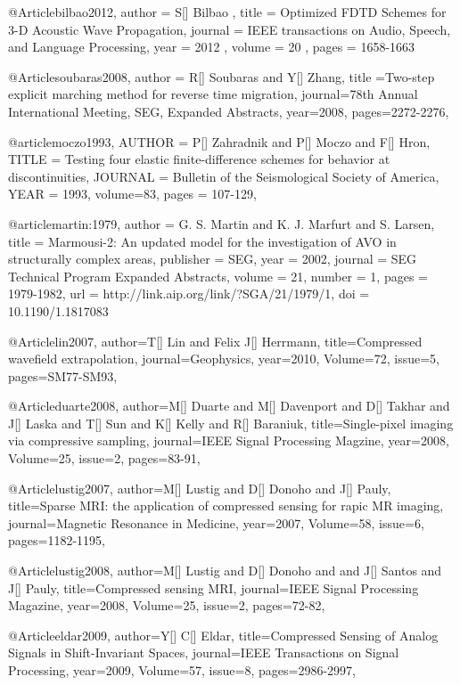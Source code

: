 {@Article{bilbao2012,
 author =  { S[] Bilbao },
 title =   {Optimized FDTD Schemes for 3-D Acoustic Wave Propagation},
 journal = { IEEE transactions on Audio, Speech, and Language Processing},
 year =    { 2012 },
 volume =  { 20 },
 pages =   { 1658-1663}
}

@Article{soubaras2008,
  author = {R[] Soubaras and Y[] Zhang},
  title ={Two-step explicit marching method for reverse time migration},
  journal={78th Annual International Meeting, SEG, Expanded Abstracts},
  year=2008,
  pages={2272-2276},
}

@article{moczo1993,
  AUTHOR =       {P[] Zahradnik and P[] Moczo and F[] Hron},
  TITLE =        {Testing four elastic finite-difference schemes for behavior at discontinuities},
  JOURNAL =      {Bulletin of the Seismological Society of America},
  YEAR =         {1993},
  volume=83,
  pages = {107-129},
}

@article{martin:1979,
  author =	 {G. S. Martin and K. J. Marfurt and S. Larsen},
  title =	 {Marmousi-2: An updated model for the investigation
                  of AVO in structurally complex areas},
  publisher =	 {SEG},
  year =	 2002,
  journal =	 {SEG Technical Program Expanded Abstracts},
  volume =	 21,
  number =	 1,
  pages =	 {1979-1982},
  url =		 {http://link.aip.org/link/?SGA/21/1979/1},
  doi =		 {10.1190/1.1817083}
}

@Article{lin2007,
  author={T[] Lin and Felix J[] Herrmann},
  title={Compressed wavefield extrapolation},
  journal={Geophysics},
  year=2010,
  Volume=72,
  issue=5,
  pages={SM77-SM93},
}

@Article{duarte2008,
  author={M[] Duarte and M[] Davenport and D[] Takhar and J[] Laska and T[] Sun and K[] Kelly and R[] Baraniuk},
  title={Single-pixel imaging via compressive sampling},
  journal={IEEE Signal Processing Magzine},
  year=2008,
  Volume=25,
  issue=2,
  pages={83-91},
}

@Article{lustig2007,
  author={M[] Lustig and D[] Donoho and J[] Pauly},
  title={Sparse MRI: the application of compressed sensing for rapic MR imaging},
  journal={Magnetic Resonance in Medicine},
  year=2007,
  Volume=58,
  issue=6,
  pages={1182-1195},
}

@Article{lustig2008,
  author={M[] Lustig and D[] Donoho and and J[] Santos and J[] Pauly},
  title={Compressed sensing MRI},
  journal={IEEE Signal Processing Magazine},
  year=2008,
  Volume=25,
  issue=2,
  pages={72-82},
}

@Article{eldar2009,
  author={Y[] C[] Eldar},
  title={Compressed Sensing of Analog Signals in Shift-Invariant Spaces},
  journal={IEEE Transactions on Signal Processing},
  year=2009,
  Volume=57,
  issue=8,
  pages={2986-2997},
}

}

